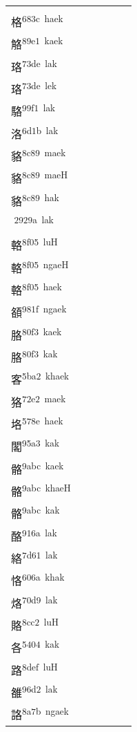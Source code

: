 \documentclass[14pt,a4paper]{scrartcl}
\begin{document}
\begin{longtable}[c]{@{}llllll@{}}
\begin{minipage}[t]{0.14\columnwidth}
\strut\end{minipage} &
\begin{minipage}[t]{0.14\columnwidth}\raggedright\strut
格\textsuperscript{683c~kaek}\\
格\textsuperscript{683c~haek}\\
觡\textsuperscript{89e1~kaek}\\
珞\textsuperscript{73de~lak}\\
珞\textsuperscript{73de~lek}\\
駱\textsuperscript{99f1~lak}\\
洛\textsuperscript{6d1b~lak}\\
貉\textsuperscript{8c89~maek}\\
貉\textsuperscript{8c89~maeH}\\
貉\textsuperscript{8c89~hak}\\
𩊚\textsuperscript{2929a~lak}\\
輅\textsuperscript{8f05~luH}\\
輅\textsuperscript{8f05~ngaeH}\\
輅\textsuperscript{8f05~haek}\\
頟\textsuperscript{981f~ngaek}\\
胳\textsuperscript{80f3~kaek}\\
胳\textsuperscript{80f3~kak}\\
客\textsuperscript{5ba2~khaek}\\
狢\textsuperscript{72e2~maek}\\
垎\textsuperscript{578e~haek}\\
閣\textsuperscript{95a3~kak}\\
骼\textsuperscript{9abc~kaek}\\
骼\textsuperscript{9abc~khaeH}\\
骼\textsuperscript{9abc~kak}\\
酪\textsuperscript{916a~lak}\\
絡\textsuperscript{7d61~lak}\\
恪\textsuperscript{606a~khak}\\
烙\textsuperscript{70d9~lak}\\
賂\textsuperscript{8cc2~luH}\\
各\textsuperscript{5404~kak}\\
路\textsuperscript{8def~luH}\\
雒\textsuperscript{96d2~lak}\\
詻\textsuperscript{8a7b~ngaek}
\strut\end{minipage} &
\begin{minipage}[t]{0.14\columnwidth}\raggedright\strut

\end{minipage}
\end{longtable}
\end{document}
